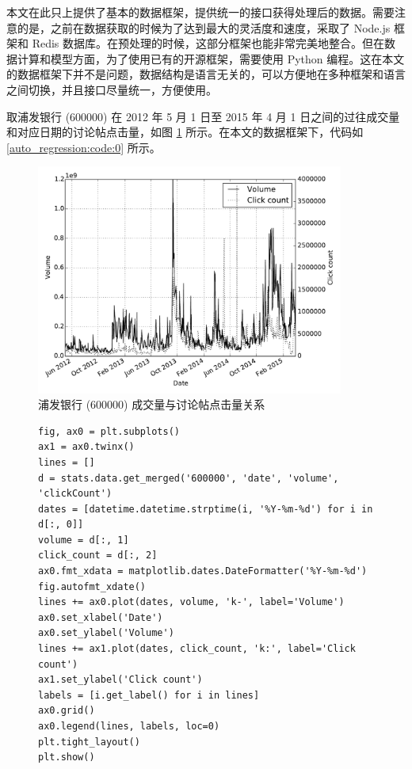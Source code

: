 本文在此只上提供了基本的数据框架，提供统一的接口获得处理后的数据。需要注意的是，之前在数据获取的时候为了达到最大的灵活度和速度，采取了 Node.js 框架和 Redis 数据库。在预处理的时候，这部分框架也能非常完美地整合。但在数据计算和模型方面，为了使用已有的开源框架，需要使用 Python 编程。这在本文的数据框架下并不是问题，数据结构是语言无关的，可以方便地在多种框架和语言之间切换，并且接口尽量统一，方便使用。

取浦发银行 (600000) 在 2012 年 5 月 1 日至 2015 年 4 月 1 日之间的过往成交量和对应日期的讨论帖点击量，如图 \ref{auto_regression:0} 所示。在本文的数据框架下，代码如 \ref{auto_regression:code:0} 所示。

\begin{figure}
  \centering
  \includegraphics[width=0.9\textwidth]{plots/click_count_volume_line.pdf}
  \caption{浦发银行 (600000) 成交量与讨论帖点击量关系}
  \label{auto_regression:0}
\end{figure}

\begin{figure}
  \begin{minipage}{\textwidth}
    \begin{lstlisting}[caption=数据框架示例, label=auto_regression:code:0]
fig, ax0 = plt.subplots()
ax1 = ax0.twinx()
lines = []
d = stats.data.get_merged('600000', 'date', 'volume', 'clickCount')
dates = [datetime.datetime.strptime(i, '%Y-%m-%d') for i in d[:, 0]]
volume = d[:, 1]
click_count = d[:, 2]
ax0.fmt_xdata = matplotlib.dates.DateFormatter('%Y-%m-%d')
fig.autofmt_xdate()
lines += ax0.plot(dates, volume, 'k-', label='Volume')
ax0.set_xlabel('Date')
ax0.set_ylabel('Volume')
lines += ax1.plot(dates, click_count, 'k:', label='Click count')
ax1.set_ylabel('Click count')
labels = [i.get_label() for i in lines]
ax0.grid()
ax0.legend(lines, labels, loc=0)
plt.tight_layout()
plt.show()
    \end{lstlisting}
  \end{minipage}
\end{figure}

